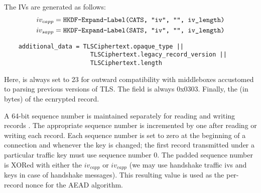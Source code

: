 The IVs are generated as follows: 
\begin{equation}
    \begin{split}
        iv_{capp} &= \texttt{HKDF-Expand-Label(CATS, "iv", "", iv\_length)}\\
        iv_{sapp} &= \texttt{HKDF-Expand-Label(SATS, "iv", "", iv\_length)}
    \end{split}
\end{equation}

\begin{verbatim}
    additional_data = TLSCiphertext.opaque_type ||
                        TLSCiphertext.legacy_record_version ||
                        TLSCiphertext.length
\end{verbatim}
Here,  is always set to 23 for outward
compatibility with middleboxes accustomed to parsing previous
versions of TLS. The  field is always 0x0303. Finally, the  (in bytes) of the ecnrypted record. 

A 64-bit sequence number is maintained separately for reading and writing records \cite{rfc8446}. The appropriate sequence number is incremented by one after reading or writing each record. Each sequence number is set to zero at the beginning of a connection and whenever the key is changed; the first record transmitted under a particular traffic key must use sequence number 0. The padded sequence number is XORed with either the $iv_{capp}$ or $iv_{capp}$ (we may use handshake traffic ivs and keys in case of handshake messages). This resulting value is used as the per-record nonce for the AEAD algorithm.